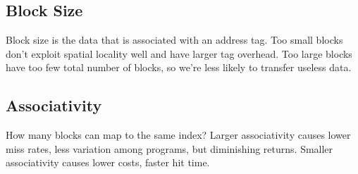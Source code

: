 \subsection{Block Size}
Block size is the data that is associated with an address tag. Too small blocks don't exploit spatial locality well and have larger tag overhead. Too large blocks have too few total number of blocks, so we're less likely to transfer useless data.

\subsection{Associativity}
How many blocks can map to the same index? Larger associativity causes lower miss rates, less variation among programs, but diminishing returns. Smaller associativity causes lower costs, faster hit time.